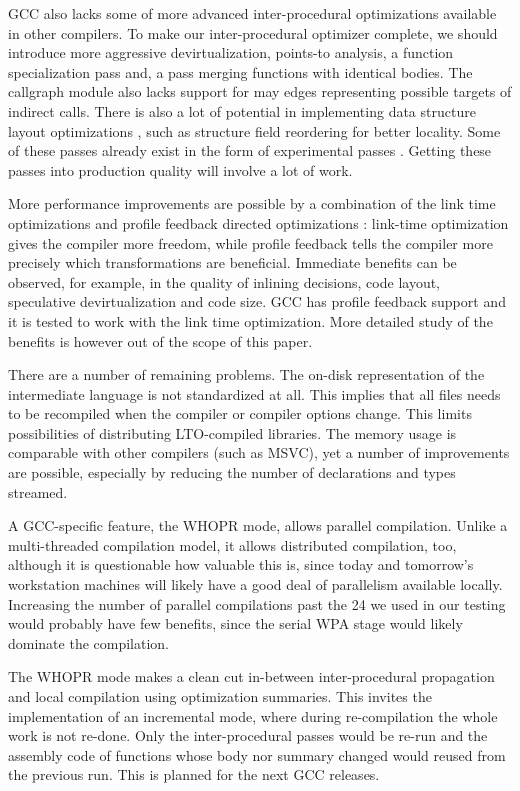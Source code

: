 \documentclass[final]{ols}
\begin{document}
GCC also lacks some of more advanced inter-procedural optimizations available in other compilers.  To make
our inter-procedural optimizer complete, we should introduce more
aggressive devirtualization, points-to analysis, a function specialization pass
and, a pass merging functions with identical bodies. The callgraph module also
lacks support for may edges representing possible targets of indirect calls.
There is also a lot of potential in implementing data structure layout
optimizations \cite{Layout}, such as structure field reordering for better
locality.  Some of these passes already exist in the form of experimental
passes \cite{structreorg, maxtrixreorg}. Getting these passes into production
quality will involve a lot of work.

More performance improvements are possible by a combination of the link
time optimizations and profile feedback directed optimizations \cite{LIPO}: link-time
optimization gives the compiler more freedom, while profile feedback tells
the compiler more precisely which transformations are beneficial.  Immediate benefits
can be observed, for example, in the quality of inlining decisions, code layout,
speculative devirtualization and code size.  GCC has
profile feedback support \cite{naspaer} and it is tested to work with the link
time optimization.  More detailed study of the benefits is however out of the
scope of this paper.

There are a number of remaining problems.  The on-disk representation of the
intermediate language is not standardized at all. This implies  that all files
needs to be recompiled when the compiler or compiler options change. This limits
possibilities of distributing LTO-compiled libraries.  The memory usage is 
comparable with other compilers (such as MSVC), yet a number of improvements are
possible, especially by reducing the number of declarations and types streamed.

A GCC-specific feature, the WHOPR mode, allows parallel compilation. Unlike a
multi-threaded compilation model, it allows distributed compilation, too,
although it is questionable how valuable this is, since today and tomorrow's
workstation machines will likely have a good deal of parallelism available
locally.  Increasing the number of parallel compilations past the 24 we used in
our testing would probably have few benefits, since the serial WPA stage would
likely dominate the compilation.

The WHOPR mode makes a clean cut in-between inter-procedural propagation and local
compilation using optimization summaries.  This invites the implementation
of an incremental mode, where during re-compilation the whole work is not
re-done. Only the inter-procedural passes would be re-run and the assembly code of
functions whose body nor summary changed would reused from the previous run.
This is planned for the next GCC releases.
\end{document}
